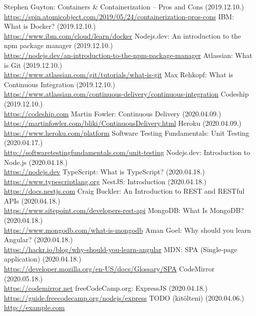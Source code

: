 \documentclass{elteikthesis}
\begin{document}
	\begin{thebibliography}{99}


			Stephen Guyton: Containers \& Containerization – Pros and Cons (2019.12.10.)
			\\\url{https://spin.atomicobject.com/2019/05/24/containerization-pros-cons}
			IBM: What is Docker? (2019.12.10.)
			\\\url{https://www.ibm.com/cloud/learn/docker}
			Nodejs.dev: An introduction to the npm package manager (2019.12.10.)
			\\\url{https://nodejs.dev/an-introduction-to-the-npm-package-manager}
			Atlassian: What is Git (2019.12.10.)
			\\\url{https://www.atlassian.com/git/tutorials/what-is-git}
			Max Rehkopf: What is Continuous Integration (2019.12.10.)
			\\\url{https://www.atlassian.com/continuous-delivery/continuous-integration}
			Codeship (2019.12.10.)
			\\\url{https://codeship.com}
			Martin Fowler: Continuous Delivery (2020.04.09.)
			\\\url{https://martinfowler.com/bliki/ContinuousDelivery.html}
			Heroku (2020.04.09.)
			\\\url{https://www.heroku.com/platform}
			Software Testing Fundamentals: Unit Testing (2020.04.17.)
			\\\url{http://softwaretestingfundamentals.com/unit-testing}
			Nodejs.dev: Introduction to Node.js (2020.04.18.)
			\\\url{https://nodejs.dev}
			TypeScript: What is TypeScript? (2020.04.18.)
			\\\url{https://www.typescriptlang.org}
			NestJS: Introduction (2020.04.18.)
			\\\url{https://docs.nestjs.com}
			Craig Buckler: An Introduction to REST and RESTful APIs (2020.04.18.)
			\\\url{https://www.sitepoint.com/developers-rest-api}
			MongoDB: What Is MongoDB? (2020.04.18.)
			\\\url{https://www.mongodb.com/what-is-mongodb}
			Aman Goel: Why should you learn Angular? (2020.04.18.)
			\\\url{https://hackr.io/blog/why-should-you-learn-angular}
			MDN: SPA (Single-page application) (2020.04.18.)
			\\\url{https://developer.mozilla.org/en-US/docs/Glossary/SPA}
			CodeMirror (2020.05.18.)
			\\\url{https://codemirror.net}
			freeCodeCamp.org: ExpressJS (2020.04.18.)
			\\\url{https://guide.freecodecamp.org/nodejs/express}
			TODO (kitölteni) (2020.04.06.)
			\\\url{http://example.com}


\end{thebibliography}
\end{document}
